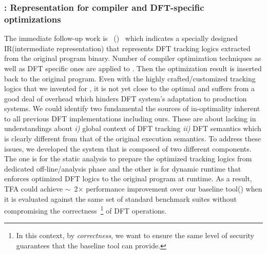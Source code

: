 \documentclass[letterpaper, 10pt]{article}
\begin{document}
\begin{small}
\subsubsection*{\TFAFull: Representation for compiler and DFT-specific
optimizations} The immediate follow-up work is
\TFAFull~(\TFA)~\cite{tfa:2012ndss} which indicates a specially designed
IR(intermediate representation) that represents DFT tracking logics extracted
from the original program binary.  Number of compiler optimization techniques
as well as DFT specific ones are applied to \TFA. Then the optimization result
is inserted back to the original program. 
%
Even with the highly crafted/customized tracking logics that we invented for
\libdft, it is not yet close to the optimal and suffers from a good deal of
overhead which hinders DFT system's adaptation to production systems. We could
identify two fundamental the sources of in-optimality inherent to all
previous DFT implementations including ours. These are about lacking in
understandings about {\it i)} global context of DFT tracking {\it ii)} DFT
semantics which is clearly different from that of the original execution
semantics.
%
To address these issues, we developed the system that is composed of two
different components. The one is for the static analysis to prepare the
optimized tracking logics from dedicated off-line/analysis phase and the other
is for dynamic runtime that enforces optimized DFT logics to the original
program  at runtime.
%
As a result, TFA could achieve \(\sim\)~2\(\times\) performance improvement
over  our baseline tool(\libdft) when it is evaluated against the same set of
standard benchmark suites without compromising the correctness~\footnote{In
        this context, by {\it correctness}, we want to ensure the same level of
security guarantees that the baseline tool \libdft can provide.} of DFT
operations.


\end{small}
\end{document}
